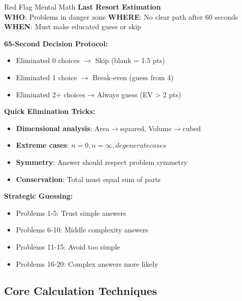 \documentclass{article}
\begin{document}
\begin{mentalbox}{Red Flag Mental Math}
{\footnotesize\textcolor{timegreen}{}}\quad\textbf{Last Resort Estimation}\\
\textbf{WHO}: Problems in danger zone
\textbf{WHERE}: No clear path after 60 seconds
\textbf{WHEN}: Must make educated guess or skip

\textbf{65-Second Decision Protocol:}
\begin{itemize}[nosep]
\item Eliminated 0 choices $\rightarrow$ Skip (blank = 1.5 pts)
\item Eliminated 1 choice $\rightarrow$ Break-even (guess from 4)
\item Eliminated 2+ choices → Always guess (EV > 2 pts)
\end{itemize}

\textbf{Quick Elimination Tricks:}
\begin{itemize}[nosep]
\item \textbf{Dimensional analysis}: Area$\rightarrow$squared, Volume$\rightarrow$cubed
\item \textbf{Extreme cases}: $n=0, n=\infty, degenerate cases$
\item \textbf{Symmetry}: Answer should respect problem symmetry
\item \textbf{Conservation}: Total must equal sum of parts
\end{itemize}

\textbf{Strategic Guessing:}
\begin{itemize}[nosep]
\item Problems 1-5: Trust simple answers
\item Problems 6-10: Middle complexity answers
\item Problems 11-15: Avoid too simple
\item Problems 16-20: Complex answers more likely
\end{itemize}
\end{mentalbox}

\subsection{Core Calculation Techniques}
\end{document}
